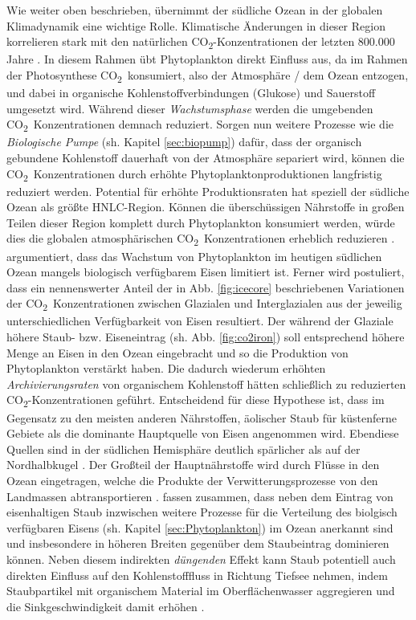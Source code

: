 \documentclass[12pt,a4paper,onecolumn]{scrartcl}
\newcommand{\cotwo}{CO\textsubscript{2}}
\begin{document}
Wie weiter oben beschrieben, übernimmt der südliche Ozean in der globalen Klimadynamik eine wichtige Rolle. Klimatische Änderungen in dieser Region korrelieren stark mit den natürlichen \cotwo -Konzentrationen der letzten 800.000 Jahre \citep{Fischer.2010}. In diesem Rahmen übt Phytoplankton direkt Einfluss aus, da im Rahmen der Photosynthese \cotwo \ konsumiert, also der Atmosphäre / dem Ozean entzogen, und dabei in organische Kohlenstoffverbindungen (Glukose) und Sauerstoff umgesetzt wird. Während dieser \textit{Wachstumsphase} werden die umgebenden \cotwo \ Konzentrationen demnach reduziert. Sorgen nun weitere Prozesse wie die \textit{Biologische Pumpe} (sh. Kapitel \ref{sec:biopump}) dafür, dass der organisch gebundene Kohlenstoff dauerhaft von der Atmosphäre separiert wird, können die \cotwo \ Konzentrationen durch erhöhte Phytoplanktonproduktionen langfristig reduziert werden. Potential für erhöhte Produktionsraten hat speziell der südliche Ozean als größte HNLC-Region. Können die überschüssigen Nährstoffe in großen Teilen dieser Region komplett durch Phytoplankton konsumiert werden, würde dies die globalen atmosphärischen \cotwo \ Konzentrationen erheblich reduzieren \citep{Martin.1990}. \citet{Martin.1990} argumentiert, dass das Wachstum von Phytoplankton im heutigen südlichen Ozean mangels biologisch verfügbarem Eisen limitiert ist. Ferner wird postuliert, dass ein nennenswerter Anteil der in Abb. \ref{fig:icecore} beschriebenen Variationen der \cotwo \ Konzentrationen zwischen Glazialen und Interglazialen aus der jeweilig unterschiedlichen Verfügbarkeit von Eisen resultiert. Der während der Glaziale höhere Staub- bzw. Eiseneintrag (sh. Abb. \ref{fig:co2iron}) soll entsprechend höhere Menge an Eisen in den Ozean eingebracht und so die Produktion von Phytoplankton verstärkt haben. Die dadurch wiederum erhöhten \textit{Archivierungsraten} von organischem Kohlenstoff hätten schließlich zu reduzierten \cotwo-Konzentrationen geführt. Entscheidend für diese Hypothese ist, dass im Gegensatz zu den meisten anderen Nährstoffen, äolischer Staub für küstenferne Gebiete als die dominante Hauptquelle von Eisen angenommen wird. Ebendiese Quellen sind in der südlichen Hemisphäre deutlich spärlicher als auf der Nordhalbkugel \citep{Shao.2011}. Der Großteil der Hauptnährstoffe wird durch Flüsse in den Ozean eingetragen, welche die Produkte der Verwitterungsprozesse von den Landmassen abtransportieren \citep{Emerson.2009}. \citet{Tagliabue.2017} fassen zusammen, dass neben dem Eintrag von eisenhaltigen Staub inzwischen weitere Prozesse für die Verteilung des biolgisch verfügbaren Eisens (sh. Kapitel \ref{sec:Phytoplankton}) im Ozean anerkannt sind und insbesondere in höheren Breiten gegenüber dem Staubeintrag dominieren können. Neben diesem indirekten \textit{düngenden} Effekt kann Staub potentiell auch direkten Einfluss auf den Kohlenstofffluss in Richtung Tiefsee nehmen, indem Staubpartikel mit organischem Material im Oberflächenwasser aggregieren und die Sinkgeschwindigkeit damit  erhöhen \citep{vanderJagt.2018} . \\
\end{document}
